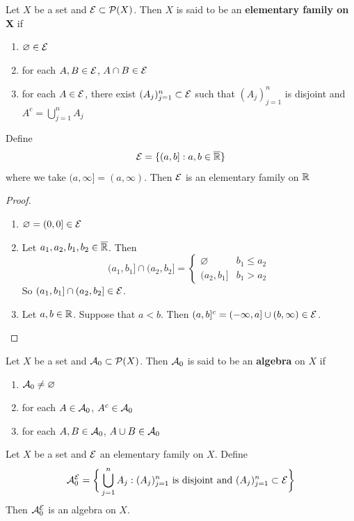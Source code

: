 \documentclass{book}
\begin{document}
	\begin{defn}  
		Let $X$ be a set and $\mathcal{E} \subset \mathcal{P}(X)$. Then $X$ is said to be an \textbf{elementary family on X} if 
		\begin{enumerate}
			\item $\varnothing \in \mathcal{E}$
			\item for each $A, B \in \mathcal{E}$, $A \cap B \in \mathcal{E}$
			\item for each $A \in \mathcal{E}$, there exist $(A_j)_{j=1}^n \subset \mathcal{E}$ such that  $(A_j)_{j=1}^n $ is disjoint and $A^c = \bigcup\limits_{j=1}^n A_j$
		\end{enumerate}
	\end{defn}
	
	\begin{ex}  
		Define $$\mathcal{E} = \{(a,b]: a,b \in \overline{\mathbb{R}}\}$$ where we take $(a, \infty] = (a, \infty)$. Then $\mathcal{E}$ is an elementary family on $\mathbb{R}$
	\end{ex}
	
	\begin{proof}\
		\begin{enumerate}
			\item $\varnothing = (0,0] \in \mathcal{E}$
			\item Let $a_1, a_2, b_1, b_2 \in \overline{\mathbb{R}}$. Then 
			\[
			(a_1, b_1] \cap  (a_2, b_2] =
			\begin{cases}
				\varnothing  & b_1 \leq a_2 \\
				(a_2, b_1] & b_1 > a_2 
			\end{cases} 
			\]
			So $(a_1, b_1] \cap  (a_2, b_2] \in \mathcal{E}$.
			\item Let $a, b \in \mathbb{R}$. Suppose that $a < b$. Then $(a,b]^c = (-\infty, a] \cup (b, \infty) \in \mathcal{E}$. 
		\end{enumerate}
	\end{proof}
	
	\begin{defn}  
		Let $X$ be a set and $\mathcal{A}_0 \subset \mathcal{P}(X)$. Then $\mathcal{A}_0$ is said to be an \textbf{algebra} on $X$ if 
		\begin{enumerate}
			\item $\mathcal{A}_0 \neq \varnothing$
			\item for each $A \in \mathcal{A}_0$, $A^c \in \mathcal{A}_0$
			\item for each $A,B \in \mathcal{A}_0$, $A \cup B \in \mathcal{A}_0$
		\end{enumerate}
	\end{defn}
	
	\begin{ex}  
		Let $X$ be a set and $\mathcal{E}$ an elementary family on $X$. Define $$\mathcal{A}^{\mathcal{E}}_0 = \bigg \{ \bigcup_{j=1}^n A_j: (A_j)_{j=1}^n \text{ is disjoint and } (A_j)_{j=1}^n \subset \mathcal{E} \bigg \}$$ Then $\mathcal{A}^{\mathcal{E}}_0$ is an algebra on $X$.
	\end{ex}	
	
\end{document}
